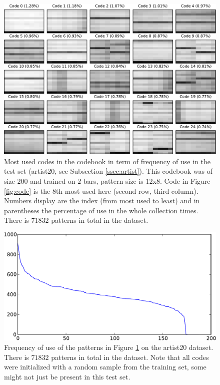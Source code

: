 \documentclass{article}
\begin{document}
\begin{figure}[htb]
\begin{center}
\includegraphics[width=.9\columnwidth]{codes1}
\end{center}
\caption{\small{
Most used codes in the codebook in term of frequency of use in the test
set (artist20, see Subsection \ref{ssec:artist}). 
This codebook was of size $200$ and trained on $2$ bars, pattern
size is $12$x$8$. Code in Figure \ref{fig:code} is the $8$th most used
here (second row, third column). 
Numbers display are the index (from most used to least) and in parentheses
the percentage of use in the whole collection times.
There is $71832$ patterns in total in the dataset.
}}
\label{fig:codes1}
\end{figure}

\begin{figure}[htb]
\begin{center}
\includegraphics[width=.7\columnwidth]{freqs}
\end{center}
\caption{\small{
Frequency of use of the patterns in Figure \ref{fig:codes1} on the
artist20 dataset. 
There is $71832$ patterns in total in the dataset.
Note that all codes were initialized with a random
sample from the training set, some might not just be present in this
test set.
}}
\label{fig:freqs}
\end{figure}
\end{document}

